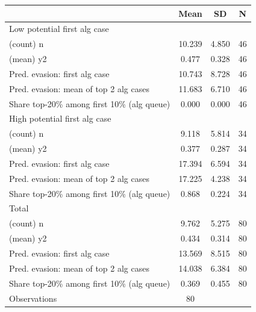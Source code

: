 {
\def\sym#1{\ifmmode^{#1}\else\(^{#1}\)\fi}
\begin{tabular}{l*{1}{ccc}}
\toprule
                    &        Mean&          SD&           N\\
\midrule
Low potential first alg case&            &            &            \\
(count) n           &      10.239&       4.850&          46\\
(mean) y2           &       0.477&       0.328&          46\\
Pred. evasion: first alg case&      10.743&       8.728&          46\\
Pred. evasion: mean of top 2 alg cases&      11.683&       6.710&          46\\
Share top-20\% among first 10\% (alg queue)&       0.000&       0.000&          46\\
\midrule
High potential first alg case&            &            &            \\
(count) n           &       9.118&       5.814&          34\\
(mean) y2           &       0.377&       0.287&          34\\
Pred. evasion: first alg case&      17.394&       6.594&          34\\
Pred. evasion: mean of top 2 alg cases&      17.225&       4.238&          34\\
Share top-20\% among first 10\% (alg queue)&       0.868&       0.224&          34\\
\midrule
Total               &            &            &            \\
(count) n           &       9.762&       5.275&          80\\
(mean) y2           &       0.434&       0.314&          80\\
Pred. evasion: first alg case&      13.569&       8.515&          80\\
Pred. evasion: mean of top 2 alg cases&      14.038&       6.384&          80\\
Share top-20\% among first 10\% (alg queue)&       0.369&       0.455&          80\\
\midrule
Observations        &          80&            &            \\
\bottomrule
\end{tabular}
}
